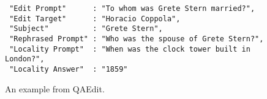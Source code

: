 \begin{figure}[t]
\centering
    \begin{tcolorbox}[
    right=0pt, left=0pt, top=0pt, bottom=0pt,
    toptitle=0.2mm, bottomtitle=0.2mm,
    colback=white,
    coltitle=white,
    colbacktitle=matisse,
    colframe=matisse,
    title=, %
    center title]
    \fontsize{6.5pt}{8pt}\selectfont
    \begin{verbatim}
 "Edit Prompt"      : "To whom was Grete Stern married?",
 "Edit Target"      : "Horacio Coppola",
 "Subject"          : "Grete Stern",
 "Rephrased Prompt" : "Who was the spouse of Grete Stern?",
 "Locality Prompt"  : "When was the clock tower built in London?",
 "Locality Answer"  : "1859"
    \end{verbatim}
    \end{tcolorbox}
    \captionsetup{skip=-3pt}
    \caption{An example from QAEdit.}
    \label{fig:QAedit_example}
\end{figure}
